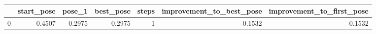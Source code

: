 \begin{tabular}{lrrrrrr}
\toprule
{} &  start\_pose &  pose\_1 &  best\_pose &  steps &  improvement\_to\_best\_pose &  improvement\_to\_first\_pose \\
\midrule
0 &      0.4507 &  0.2975 &     0.2975 &      1 &                   -0.1532 &                    -0.1532 \\
\bottomrule
\end{tabular}
